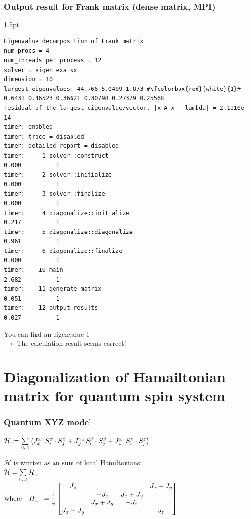 \begin{frame}[c,fragile]
  \frametitle{Output result for Frank matrix (dense matrix, MPI)}
\setlength { \fboxrule } { 1.5pt }
\begin{lstlisting}[style=shstyle]
Eigenvalue decomposition of Frank matrix
num_procs = 4
num_threads per process = 12
solver = eigen_exa_sx
dimension = 10
largest eigenvalues: 44.766 5.0489 1.873 #\fcolorbox{red}{white}{1}# 0.6431 0.46523 0.36621 0.30798 0.27379 0.25568
residual of the largest eigenvalue/vector: |x A x - lambda| = 2.1316e-14
timer: enabled
timer: trace = disabled
timer: detailed report = disabled
timer:     1 solver::construct                                              0.000          1
timer:     2 solver::initialize                                             0.000          1
timer:     3 solver::finalize                                               0.000          1
timer:     4 diagonalize::initialize                                        0.217          1
timer:     5 diagonalize::diagonalize                                       0.961          1
timer:     6 diagonalize::finalize                                          0.000          1
timer:    10 main                                                           2.682          1
timer:    11 generate_matrix                                                0.051          1
timer:    12 output_results                                                 0.027          1
\end{lstlisting}
You can find an eigenvalue 1\\
$\longrightarrow$ The calculation result seems correct!
\end{frame}


\section{Diagonalization of Hamailtonian matrix for quantum spin system}

\begin{frame}[c,fragile]
  \frametitle{Quantum XYZ model}
\setlength{\fboxsep}{1pt}

\noindent
$\mathcal{H}
 := \sum\limits_{\middlescr{{\langle i,j \rangle}}} \left(
  J_x^{\smallscr{\langle i,j \rangle}} \, S^x_i \cdot S^x_j
+ J_y^{\smallscr{\langle i,j \rangle}} \, S^y_i \cdot S^y_j
+ J_z^{\smallscr{\langle i,j \rangle}} \, S^z_i \cdot S^z_j
\right)$

\vspace{1\baselineskip}

\noindent
$\mathcal{H}$ is written as an sum of local Hamiltonians:\\
\noindent
$\mathcal{H} =
\sum\limits_{\middlescr{\langle i,j \rangle}}  \mathcal{H}_{\smallscr{\langle i,j \rangle}}$ \\
$\text{where} \quad  H_{\smallscr{\langle i,j \rangle}} :=
\dfrac{1}{4}
\begin{bmatrix}
J_z & & & J_x-J_y \\
 & - J_z & J_x+J_y & \\
 & J_x+J_y & - J_z & \\
J_x-J_y & & & J_z
\end{bmatrix}$

\end{frame}


